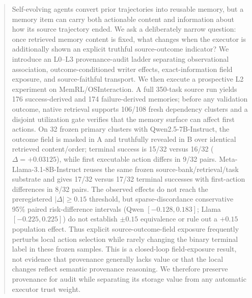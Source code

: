 \begin{abstract}
Self-evolving agents convert prior trajectories into reusable memory, but a memory item can carry both actionable content and information about how its source trajectory ended. We ask a deliberately narrow question: once retrieved memory content is fixed, what changes when the executor is additionally shown an explicit truthful source-outcome indicator? We introduce an L0--L3 provenance-audit ladder separating observational association, outcome-conditioned writer effects, exact-information field exposure, and source-faithful transport. We then execute a prospective L2 experiment on MemRL/OSInteraction. A full 350-task source run yields 176 success-derived and 174 failure-derived memories; before any validation outcome, native retrieval supports 106/108 fresh dependency clusters and a disjoint utilization gate verifies that the memory surface can affect first actions. On 32 frozen primary clusters with Qwen2.5-7B-Instruct, the outcome field is masked in A and truthfully revealed in B over identical retrieved content/order; terminal success is 15/32 versus 16/32 ($\Delta=+0.03125$), while first executable action differs in 9/32 pairs. Meta-Llama-3.1-8B-Instruct reuses the same frozen source-bank/retrieval/task substrate and gives 17/32 versus 17/32 terminal successes with first-action differences in 8/32 pairs. The observed effects do not reach the preregistered $|\Delta|\geq0.15$ threshold, but sparse-discordance conservative 95\% paired risk-difference intervals (Qwen $[-0.128,0.183]$; Llama $[-0.225,0.225]$) do not establish $\pm0.15$ equivalence or rule out a $+0.15$ population effect. Thus explicit source-outcome-field exposure frequently perturbs local action selection while rarely changing the binary terminal label in these frozen samples. This is a closed-loop field-exposure result, not evidence that provenance generally lacks value or that the local changes reflect semantic provenance reasoning. We therefore preserve provenance for audit while separating its storage value from any automatic executor trust weight.
\end{abstract}
